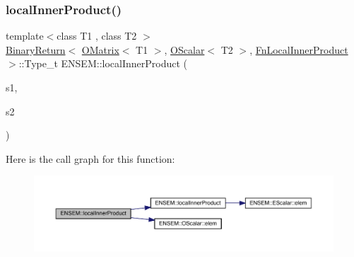 \subsubsection{\texorpdfstring{localInnerProduct()}{localInnerProduct()}\hspace{0.1cm}{\footnotesize\ttfamily [2/3]}}
{\footnotesize\ttfamily template$<$class T1 , class T2 $>$ \\
\mbox{\hyperlink{structENSEM_1_1BinaryReturn}{Binary\+Return}}$<$ \mbox{\hyperlink{classENSEM_1_1OMatrix}{O\+Matrix}}$<$ T1 $>$, \mbox{\hyperlink{classENSEM_1_1OScalar}{O\+Scalar}}$<$ T2 $>$, \mbox{\hyperlink{structENSEM_1_1FnLocalInnerProduct}{Fn\+Local\+Inner\+Product}} $>$\+::Type\+\_\+t E\+N\+S\+E\+M\+::local\+Inner\+Product (\begin{DoxyParamCaption}\item[{const \mbox{\hyperlink{classENSEM_1_1OMatrix}{O\+Matrix}}$<$ T1 $>$ \&}]{s1,  }\item[{const \mbox{\hyperlink{classENSEM_1_1OScalar}{O\+Scalar}}$<$ T2 $>$ \&}]{s2 }\end{DoxyParamCaption})\hspace{0.3cm}{\ttfamily [inline]}}

Here is the call graph for this function\+:\nopagebreak
\begin{figure}[H]
\begin{center}
\leavevmode
\includegraphics[width=350pt]{d8/d55/group__obsmatrix_ga23c94fe0afdadaedf50d233d675f0009_cgraph}
\end{center}
\end{figure}
\mbox{\label{group__obsmatrix_gac43a43c02ea508251047ef46cbc6924c}} 
